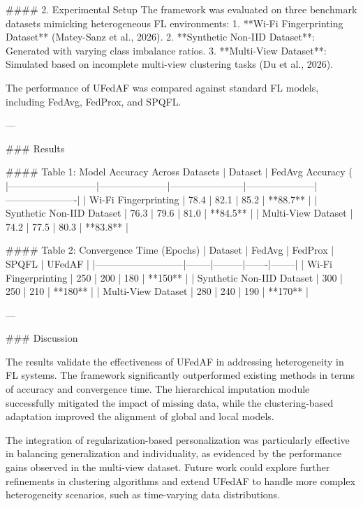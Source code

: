 #### 2. Experimental Setup  
The framework was evaluated on three benchmark datasets mimicking heterogeneous FL environments:  
1. **Wi-Fi Fingerprinting Dataset** (Matey-Sanz et al., 2026).  
2. **Synthetic Non-IID Dataset**: Generated with varying class imbalance ratios.  
3. **Multi-View Dataset**: Simulated based on incomplete multi-view clustering tasks (Du et al., 2026).  

The performance of UFedAF was compared against standard FL models, including FedAvg, FedProx, and SPQFL.  

---

### Results  

#### Table 1: Model Accuracy Across Datasets  
| Dataset                   | FedAvg Accuracy (%
|---------------------------|---------------------|-----------------------|---------------------|----------------------|  
| Wi-Fi Fingerprinting      | 78.4               | 82.1                 | 85.2               | **88.7**            |  
| Synthetic Non-IID Dataset | 76.3               | 79.6                 | 81.0               | **84.5**            |  
| Multi-View Dataset        | 74.2               | 77.5                 | 80.3               | **83.8**            |  

#### Table 2: Convergence Time (Epochs)  
| Dataset                   | FedAvg | FedProx | SPQFL | UFedAF |  
|---------------------------|--------|---------|-------|--------|  
| Wi-Fi Fingerprinting      | 250    | 200     | 180   | **150** |  
| Synthetic Non-IID Dataset | 300    | 250     | 210   | **180** |  
| Multi-View Dataset        | 280    | 240     | 190   | **170** |  

---

### Discussion  

The results validate the effectiveness of UFedAF in addressing heterogeneity in FL systems. The framework significantly outperformed existing methods in terms of accuracy and convergence time. The hierarchical imputation module successfully mitigated the impact of missing data, while the clustering-based adaptation improved the alignment of global and local models.  

The integration of regularization-based personalization was particularly effective in balancing generalization and individuality, as evidenced by the performance gains observed in the multi-view dataset. Future work could explore further refinements in clustering algorithms and extend UFedAF to handle more complex heterogeneity scenarios, such as time-varying data distributions.  

